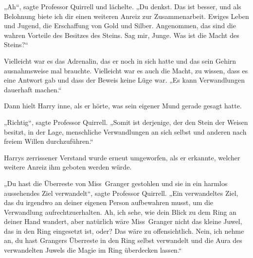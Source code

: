 „Ah“, sagte Professor Quirrell und lächelte.
„Du denkst. Das ist besser, und als Belohnung biete ich dir einen weiteren Anreiz zur Zusammenarbeit. Ewiges Leben und Jugend, die Erschaffung von Gold und Silber. Angenommen, das sind die wahren Vorteile des Besitzes des Steins. Sag mir, Junge. Was ist die Macht des Steins?“

Vielleicht war es das Adrenalin, das er noch in sich hatte und das sein Gehirn ausnahmsweise mal brauchte. Vielleicht war es auch die Macht, zu wissen, dass es eine Antwort gab und dass der Beweis keine Lüge war.
„Es kann Verwandlungen dauerhaft machen.“

Dann hielt Harry inne, als er hörte, was sein eigener Mund gerade gesagt hatte.

„Richtig“, sagte Professor Quirrell.
„Somit ist derjenige, der den Stein der Weisen besitzt, in der Lage, menschliche Verwandlungen an sich selbst und anderen nach freiem Willen durchzuführen.“

Harrys zerrissener Verstand wurde erneut umgeworfen, als er erkannte, welcher weitere Anreiz ihm geboten werden würde.

„Du hast die Überreste von Miss~Granger gestohlen und sie in ein harmlos aussehendes Ziel verwandelt“, sagte Professor Quirrell.
„Ein verwandeltes Ziel, das du irgendwo an deiner eigenen Person aufbewahren musst, um die Verwandlung aufrechtzuerhalten. Ah, ich sehe, wie dein Blick zu dem Ring an deiner Hand wandert, aber natürlich wäre Miss~Granger nicht das kleine Juwel, das in den Ring eingesetzt ist, oder? Das wäre zu offensichtlich. Nein, ich nehme an, du hast Grangers Überreste in den Ring selbst verwandelt und die Aura des verwandelten Juwels die Magie im Ring überdecken lassen.“

